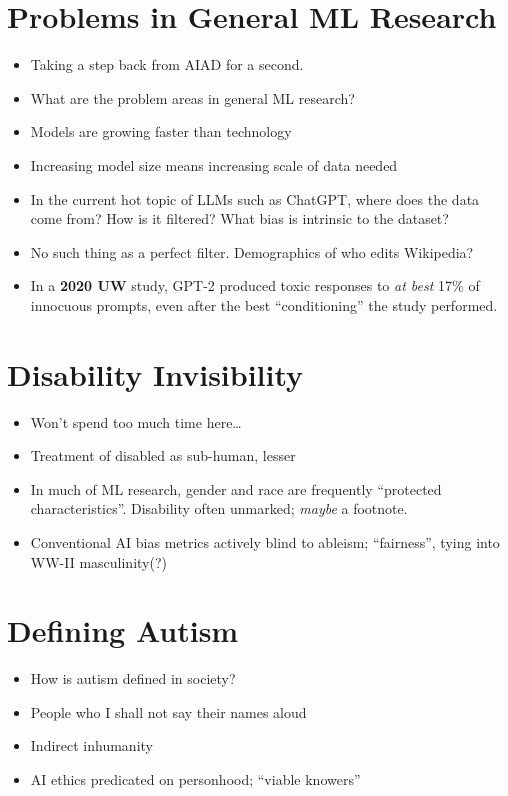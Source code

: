 \documentclass[twoside, letterpaper, twocolumn]{article}
\begin{document}
\section{Problems in General ML Research}
\begin{itemize}
    \item Taking a step back from AIAD for a second.
    \item What are the problem areas in general ML research?
    \item Models are growing faster than technology
    \item Increasing model size means increasing scale of data needed
    \item In the current hot topic of LLMs such as ChatGPT, where does the data come from? How is it filtered? What bias is intrinsic to the dataset? 
    \item No such thing as a perfect filter. Demographics of who edits Wikipedia?
    \item In a \textbf{2020 UW} study, GPT-2 produced toxic responses to \textit{at best} 17\% of innocuous prompts, even after the best ``conditioning'' the study performed.
\end{itemize}
\newpage
\section{Disability Invisibility}
\begin{itemize}
    \item Won't spend too much time here\dots
    \item Treatment of disabled as sub-human, lesser
    \item In much of ML research, gender and race are frequently ``protected characteristics''. Disability often unmarked; \textit{maybe} a footnote.
    \item Conventional AI bias metrics actively blind to ableism; ``fairness'', tying into WW-II masculinity(?)
\end{itemize}
\section{Defining Autism}
\begin{itemize}
    \item How is autism defined in society?
    \item People who I shall not say their names aloud
    \item Indirect inhumanity
    \item AI ethics predicated on personhood; ``viable knowers''
\end{itemize}
\end{document}
